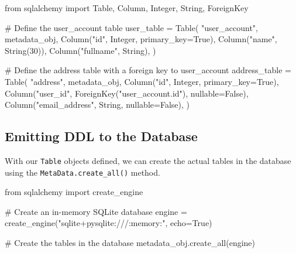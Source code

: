 \documentclass[
  letterpaper,
  DIV=11,
  numbers=noendperiod]{scrreprt}
\newenvironment{Shaded}{\begin{snugshade}}{\end{snugshade}}
\newcommand{\CommentTok}[1]{\textcolor[rgb]{0.37,0.37,0.37}{#1}}
\newcommand{\DecValTok}[1]{\textcolor[rgb]{0.68,0.00,0.00}{#1}}
\newcommand{\ImportTok}[1]{\textcolor[rgb]{0.00,0.46,0.62}{#1}}
\newcommand{\NormalTok}[1]{\textcolor[rgb]{0.00,0.23,0.31}{#1}}
\newcommand{\OperatorTok}[1]{\textcolor[rgb]{0.37,0.37,0.37}{#1}}
\newcommand{\StringTok}[1]{\textcolor[rgb]{0.13,0.47,0.30}{#1}}
\newcommand{\VariableTok}[1]{\textcolor[rgb]{0.07,0.07,0.07}{#1}}
\begin{document}
\begin{Shaded}
\begin{Highlighting}[]
\ImportTok{from}\NormalTok{ sqlalchemy }\ImportTok{import}\NormalTok{ Table, Column, Integer, String, ForeignKey}

\CommentTok{\# Define the user\_account table}
\NormalTok{user\_table }\OperatorTok{=}\NormalTok{ Table(}
    \StringTok{"user\_account"}\NormalTok{,}
\NormalTok{    metadata\_obj,}
\NormalTok{    Column(}\StringTok{"id"}\NormalTok{, Integer, primary\_key}\OperatorTok{=}\VariableTok{True}\NormalTok{),}
\NormalTok{    Column(}\StringTok{"name"}\NormalTok{, String(}\DecValTok{30}\NormalTok{)),}
\NormalTok{    Column(}\StringTok{"fullname"}\NormalTok{, String),}
\NormalTok{)}

\CommentTok{\# Define the address table with a foreign key to user\_account}
\NormalTok{address\_table }\OperatorTok{=}\NormalTok{ Table(}
    \StringTok{"address"}\NormalTok{,}
\NormalTok{    metadata\_obj,}
\NormalTok{    Column(}\StringTok{"id"}\NormalTok{, Integer, primary\_key}\OperatorTok{=}\VariableTok{True}\NormalTok{),}
\NormalTok{    Column(}\StringTok{"user\_id"}\NormalTok{, ForeignKey(}\StringTok{"user\_account.id"}\NormalTok{), nullable}\OperatorTok{=}\VariableTok{False}\NormalTok{),}
\NormalTok{    Column(}\StringTok{"email\_address"}\NormalTok{, String, nullable}\OperatorTok{=}\VariableTok{False}\NormalTok{),}
\NormalTok{)}
\end{Highlighting}
\end{Shaded}

\subsection{Emitting DDL to the
Database}\label{emitting-ddl-to-the-database}

With our \texttt{Table} objects defined, we can create the actual tables
in the database using the \texttt{MetaData.create\_all()} method.

\begin{Shaded}
\begin{Highlighting}[]
\ImportTok{from}\NormalTok{ sqlalchemy }\ImportTok{import}\NormalTok{ create\_engine}

\CommentTok{\# Create an in{-}memory SQLite database}
\NormalTok{engine }\OperatorTok{=}\NormalTok{ create\_engine(}\StringTok{"sqlite+pysqlite:///:memory:"}\NormalTok{, echo}\OperatorTok{=}\VariableTok{True}\NormalTok{)}

\CommentTok{\# Create the tables in the database}
\NormalTok{metadata\_obj.create\_all(engine)}
\end{Highlighting}
\end{Shaded}
\end{document}
